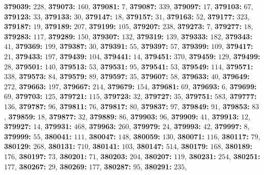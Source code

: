 \textsf{\bfseries 379039:} $228$, \textsf{\bfseries 379073:} $160$, \textsf{\bfseries 379081:} $7$, \textsf{\bfseries 379087:} $339$, \textsf{\bfseries 379097:} $17$, \textsf{\bfseries 379103:} $67$, \textsf{\bfseries 379123:} $33$, \textsf{\bfseries 379133:} $30$, \textsf{\bfseries 379147:} $18$, \textsf{\bfseries 379157:} $31$, \textsf{\bfseries 379163:} $52$, \textsf{\bfseries 379177:} $323$, \textsf{\bfseries 379187:} $19$, \textsf{\bfseries 379189:} $207$, \textsf{\bfseries 379199:} $105$, \textsf{\bfseries 379207:} $238$, \textsf{\bfseries 379273:} $7$, \textsf{\bfseries 379277:} $18$, \textsf{\bfseries 379283:} $117$, \textsf{\bfseries 379289:} $150$, \textsf{\bfseries 379307:} $132$, \textsf{\bfseries 379319:} $139$, \textsf{\bfseries 379333:} $182$, \textsf{\bfseries 379343:} $41$, \textsf{\bfseries 379369:} $199$, \textsf{\bfseries 379387:} $30$, \textsf{\bfseries 379391:} $55$, \textsf{\bfseries 379397:} $57$, \textsf{\bfseries 379399:} $109$, \textsf{\bfseries 379417:} $21$, \textsf{\bfseries 379433:} $197$, \textsf{\bfseries 379439:} $104$, \textsf{\bfseries 379441:} $14$, \textsf{\bfseries 379451:} $370$, \textsf{\bfseries 379459:} $129$, \textsf{\bfseries 379499:} $28$, \textsf{\bfseries 379501:} $140$, \textsf{\bfseries 379513:} $53$, \textsf{\bfseries 379531:} $95$, \textsf{\bfseries 379541:} $53$, \textsf{\bfseries 379549:} $114$, \textsf{\bfseries 379571:} $338$, \textsf{\bfseries 379573:} $84$, \textsf{\bfseries 379579:} $89$, \textsf{\bfseries 379597:} $35$, \textsf{\bfseries 379607:} $58$, \textsf{\bfseries 379633:} $40$, \textsf{\bfseries 379649:} $272$, \textsf{\bfseries 379663:} $197$, \textsf{\bfseries 379667:} $214$, \textsf{\bfseries 379679:} $154$, \textsf{\bfseries 379681:} $69$, \textsf{\bfseries 379693:} $6$, \textsf{\bfseries 379699:} $69$, \textsf{\bfseries 379703:} $125$, \textsf{\bfseries 379721:} $115$, \textsf{\bfseries 379723:} $32$, \textsf{\bfseries 379727:} $35$, \textsf{\bfseries 379751:} $583$, \textsf{\bfseries 379777:} $136$, \textsf{\bfseries 379787:} $96$, \textsf{\bfseries 379811:} $76$, \textsf{\bfseries 379817:} $80$, \textsf{\bfseries 379837:} $97$, \textsf{\bfseries 379849:} $91$, \textsf{\bfseries 379853:} $83$, \textsf{\bfseries 379859:} $18$, \textsf{\bfseries 379877:} $32$, \textsf{\bfseries 379889:} $86$, \textsf{\bfseries 379903:} $96$, \textsf{\bfseries 379909:} $41$, \textsf{\bfseries 379913:} $12$, \textsf{\bfseries 379927:} $14$, \textsf{\bfseries 379931:} $468$, \textsf{\bfseries 379963:} $260$, \textsf{\bfseries 379979:} $24$, \textsf{\bfseries 379993:} $42$, \textsf{\bfseries 379997:} $8$, \textsf{\bfseries 379999:} $55$, \textsf{\bfseries 380041:} $111$, \textsf{\bfseries 380047:} $148$, \textsf{\bfseries 380059:} $130$, \textsf{\bfseries 380071:} $116$, \textsf{\bfseries 380117:} $79$, \textsf{\bfseries 380129:} $268$, \textsf{\bfseries 380131:} $710$, \textsf{\bfseries 380141:} $103$, \textsf{\bfseries 380147:} $514$, \textsf{\bfseries 380179:} $168$, \textsf{\bfseries 380189:} $176$, \textsf{\bfseries 380197:} $73$, \textsf{\bfseries 380201:} $71$, \textsf{\bfseries 380203:} $204$, \textsf{\bfseries 380207:} $119$, \textsf{\bfseries 380231:} $254$, \textsf{\bfseries 380251:} $177$, \textsf{\bfseries 380267:} $29$, \textsf{\bfseries 380269:} $177$, \textsf{\bfseries 380287:} $95$, \textsf{\bfseries 380291:} $235$, 
